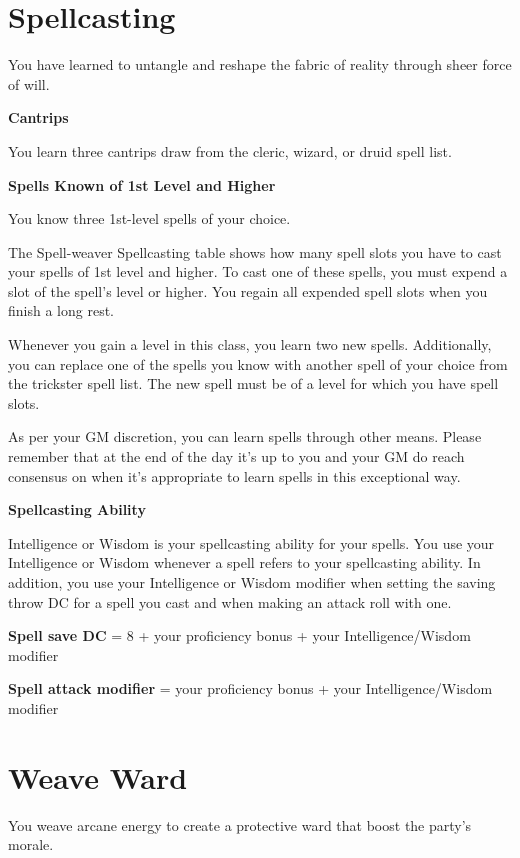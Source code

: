 \begin{multicols*}{2}
\section*{Spellcasting}

You have learned to untangle and reshape the fabric of reality through sheer force of will.

\textbf{Cantrips}

You learn three cantrips draw from the cleric, wizard, or druid spell list. 


\textbf{Spells Known of 1st Level and Higher}

You know three 1st-level spells of your choice.

The Spell-weaver Spellcasting table shows how many spell slots you have to cast your spells of 1st level and higher. To cast one of these spells, you must expend a slot of the spell's level or higher. You regain all expended spell slots when you finish a long rest.


Whenever you gain a level in this class, you learn two new spells. Additionally, you can replace one of the spells you know with another spell of your choice from the trickster spell list. The new spell must be of a level for which you have spell slots.

As per your GM discretion, you can learn spells through other means. Please remember that at the end of the day it's up to you and your GM do reach consensus on when it's appropriate to learn spells in this exceptional way.

\textbf{Spellcasting Ability}

Intelligence or Wisdom is your spellcasting ability for your spells. You use your Intelligence or Wisdom whenever a spell refers to your spellcasting ability. In addition, you use your Intelligence or Wisdom modifier when setting the saving throw DC for a spell you cast and when making an attack roll with one.

\textbf{Spell save DC} = 8 + your proficiency bonus + your Intelligence/Wisdom modifier

\textbf{Spell attack modifier} = your proficiency bonus + your Intelligence/Wisdom modifier


\section*{Weave Ward}

You weave arcane energy to create a protective ward that boost the party's morale.


\end{multicols*}

